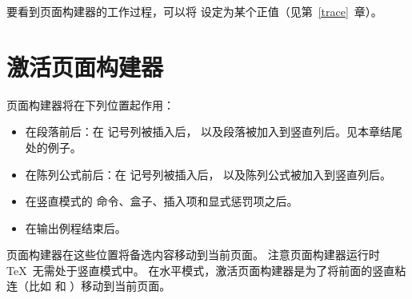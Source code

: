 \documentclass{book}
\begin{document}
要看到页面构建器的工作过程，可以将 
设定为某个正值（见第~\ref{trace}~章）。

\section{激活页面构建器}

页面构建器将在下列位置起作用：
\begin{itemize}
\item 在段落前后：在  记号列被插入后，
  以及段落被加入到竖直列后。见本章结尾处的例子。
\item 在陈列公式前后：在  记号列被插入后，
  以及陈列公式被加入到竖直列后。
\item 在竖直模式的  命令、盒子、插入项和显式惩罚项之后。
\item 在输出例程结束后。
\end{itemize}
页面构建器在这些位置将备选内容移动到当前页面。
注意页面构建器运行时 \TeX\ 无需处于竖直模式中。
在水平模式，激活页面构建器是为了将前面的竖直粘连（比如 
和 ）移动到当前页面。
\end{document}
